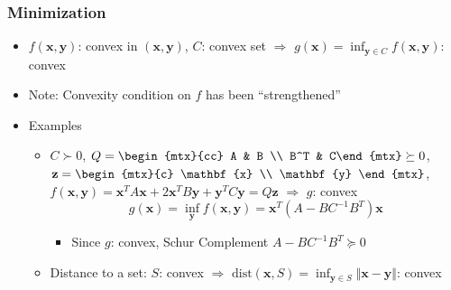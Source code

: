 \subsubsection*{Minimization}
\begin{itemize}
    \item $f(\mathbf{x}, \mathbf{y})$: convex in $(\mathbf{x}, \mathbf{y})$, $C$: convex set
        $\Rightarrow$ $g(\mathbf{x}) = \inf_{\mathbf{y} \in C} f(\mathbf{x}, \mathbf{y})$: convex
    \item Note: Convexity condition on $f$ has been ``strengthened''
    \item Examples
    \begin{itemize}
        \item $C \succ 0$, $Q = \begin{mtx}{cc} A & B \\ B^T & C\end{mtx} \succeq 0$,
            $\mathbf{z} = \begin{mtx}{c} \mathbf{x} \\ \mathbf{y} \end{mtx}$,
            $f(\mathbf{x}, \mathbf{y}) = \mathbf{x}^TA\mathbf{x} + 2\mathbf{x}^TB\mathbf{y} + \mathbf{y}^TC\mathbf{y} = Q\mathbf{z}$ $\Rightarrow$ $g$: convex
            \begin{equation}
                g(\mathbf{x}) = \inf_{\mathbf{y}} f(\mathbf{x}, \mathbf{y}) = \mathbf{x}^T (A - BC^{-1}B^T)\mathbf{x}
            \end{equation}
            \begin{itemize}
                \item Since $g$: convex, Schur Complement $A - BC^{-1}B^T \succeq 0$
            \end{itemize}
        \item Distance to a set: $S$: convex $\Rightarrow$
            $\mathrm{dist}(\mathbf{x}, S) = \inf_{\mathbf{y} \in S} \Vert \mathbf{x} - \mathbf{y} \Vert$: convex
    \end{itemize}
\end{itemize}

